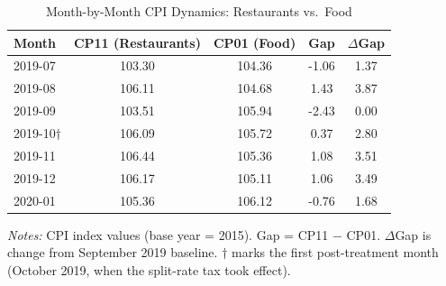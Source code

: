 \begin{table}[htbp]
\centering
\caption{Month-by-Month CPI Dynamics: Restaurants vs.\ Food}
\label{tab:dynamics}
\begin{tabular}{lcccc}
\hline\hline
Month & CP11 (Restaurants) & CP01 (Food) & Gap & $\Delta$Gap \\
\hline
2019-07 & 103.30 & 104.36 & -1.06 & 1.37 \\
2019-08 & 106.11 & 104.68 & 1.43 & 3.87 \\
2019-09 & 103.51 & 105.94 & -2.43 & 0.00 \\
2019-10$\dagger$ & 106.09 & 105.72 & 0.37 & 2.80 \\
2019-11 & 106.44 & 105.36 & 1.08 & 3.51 \\
2019-12 & 106.17 & 105.11 & 1.06 & 3.49 \\
2020-01 & 105.36 & 106.12 & -0.76 & 1.68 \\
\hline\hline
\end{tabular}
\begin{tablenotes}[flushleft]
\small
\item \textit{Notes:} CPI index values (base year = 2015). Gap = CP11 $-$ CP01. $\Delta$Gap is change from September 2019 baseline. $\dagger$ marks the first post-treatment month (October 2019, when the split-rate tax took effect).
\end{tablenotes}
\end{table}
